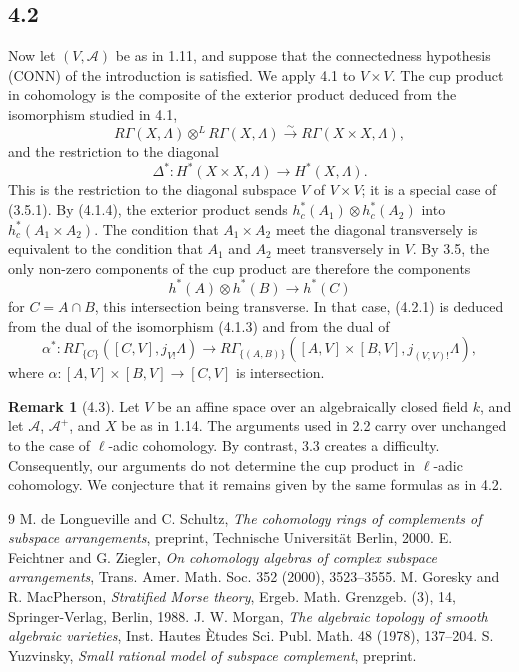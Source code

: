 \documentclass[11pt]{article}
\theoremstyle{definition}
\newtheorem{remark}[theorem]{Remark}
\begin{document}
\subsection*{4.2}
Now let $(V,\mathcal A)$ be as in 1.11, and suppose that the connectedness hypothesis \textup{(CONN)} of the introduction is satisfied.  We apply 4.1 to $V\times V$.  The cup product in cohomology is the composite of the exterior product deduced from the isomorphism studied in 4.1,
\[
R\Gamma(X,\Lambda)\otimes^L R\Gamma(X,\Lambda)\xrightarrow{\sim}R\Gamma(X\times X,\Lambda),
\]
and the restriction to the diagonal
\[
\Delta^*:H^*(X\times X,\Lambda)\longrightarrow H^*(X,\Lambda).
\]
This is the restriction to the diagonal subspace $V$ of $V\times V$; it is a special case of (3.5.1).  By (4.1.4), the exterior product sends $h_c^*(A_1)\otimes h_c^*(A_2)$ into $h_c^*(A_1\times A_2)$.  The condition that $A_1\times A_2$ meet the diagonal transversely is equivalent to the condition that $A_1$ and $A_2$ meet transversely in $V$.  By 3.5, the only non-zero components of the cup product are therefore the components
\begin{equation}
h^*(A)\otimes h^*(B)\longrightarrow h^*(C)\tag{4.2.1}
\end{equation}
for $C=A\cap B$, this intersection being transverse.  In that case, (4.2.1) is deduced from the dual of the isomorphism (4.1.3) and from the dual of
\[
\alpha^*:R\Gamma_{\{C\}}([C,V],j_{V!}\Lambda)\to R\Gamma_{\{(A,B)\}}([A,V]\times[B,V],j_{(V,V)!}\Lambda),
\]
where $\alpha:[A,V]\times[B,V]\to[C,V]$ is intersection.

\begin{remark}[4.3]
Let $V$ be an affine space over an algebraically closed field $k$, and let $\mathcal A$, $\mathcal A^+$, and $X$ be as in 1.14.  The arguments used in 2.2 carry over unchanged to the case of $\ell$-adic cohomology.  By contrast, 3.3 creates a difficulty.  Consequently, our arguments do not determine the cup product in $\ell$-adic cohomology.  We conjecture that it remains given by the same formulas as in 4.2.
\end{remark}

\begin{thebibliography}{9}
 M. de Longueville and C. Schultz, \emph{The cohomology rings of complements of subspace arrangements}, preprint, Technische Universit\"at Berlin, 2000.
 E. Feichtner and G. Ziegler, \emph{On cohomology algebras of complex subspace arrangements}, Trans. Amer. Math. Soc. 352 (2000), 3523--3555.
 M. Goresky and R. MacPherson, \emph{Stratified Morse theory}, Ergeb. Math. Grenzgeb. (3), 14, Springer-Verlag, Berlin, 1988.
 J. W. Morgan, \emph{The algebraic topology of smooth algebraic varieties}, Inst. Hautes \`Etudes Sci. Publ. Math. 48 (1978), 137--204.
 S. Yuzvinsky, \emph{Small rational model of subspace complement}, preprint.
\end{thebibliography}
\end{document}
